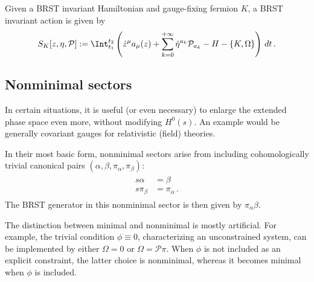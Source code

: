 
    Given a BRST invariant Hamiltonian and gauge-fixing fermion $K$, a BRST invariant action is given by
    \begin{gather}
        S_K[z,\eta,\mathcal{P}] := \Int_{t_1}^{t_2}\left(\dot{z}^\mu a_\mu(z)+\sum_{k=0}^{+\infty}\dot{\eta}^{a_k}\mathcal{P}_{a_k}-H-\{K,\Omega\}\right)\,dt\,.
    \end{gather}

\subsection{Nonminimal sectors}\label{section:nonminimal_sectors}

    In certain situations, it is useful (or even necessary) to enlarge the extended phase space even more, without modifying $H^0(s)$. An example would be generally covariant gauges for relativistic (field) theories.
    
    In their most basic form, nonminimal sectors arise from including cohomologically trivial canonical pairs $(\alpha,\beta,\pi_\alpha,\pi_\beta)$:
    \begin{gather}
        \begin{aligned}
            s\alpha &= \beta\\
            s\pi_\beta &= \pi_\alpha\,.
        \end{aligned}
    \end{gather}
    The BRST generator in this nonminimal sector is then given by $\pi_\alpha\beta$.

    \begin{remark}
        The distinction between minimal and nonminimal is mostly artificial. For example, the trivial condition $\phi\equiv0$, characterizing an unconstrained system, can be implemented by either $\Omega=0$ or $\Omega=\mathcal{P}\pi$. When $\phi$ is not included as an explicit constraint, the latter choice is nonminimal, whereas it becomes minimal when $\phi$ is included.
    \end{remark}

